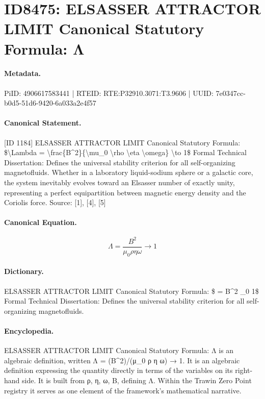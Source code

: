 \section*{ID8475: ELSASSER ATTRACTOR LIMIT Canonical Statutory Formula: Λ}
\paragraph{Metadata.}
PiID: 4906617583441 | RTEID: RTE:P32910.3071:T3.9606 | UUID: 7e0347cc-b0d5-51d6-9420-6a033a2e4f57

\paragraph{Canonical Statement.}
[ID 1184] ELSASSER ATTRACTOR LIMIT Canonical Statutory Formula: \$\textbackslash{}Lambda = \textbackslash{}frac\{B\textasciicircum{}2\}\{\textbackslash{}mu\_0 \textbackslash{}rho \textbackslash{}eta \textbackslash{}omega\} \textbackslash{}to 1\$ Formal Technical Dissertation: Defines the universal stability criterion for all self-organizing magnetofluids. Whether in a laboratory liquid-sodium sphere or a galactic core, the system inevitably evolves toward an Elsasser number of exactly unity, representing a perfect equipartition between magnetic energy density and the Coriolis force. Source: [1], [4], [5]

\paragraph{Canonical Equation.}
\[
\Lambda = \frac{B^2}{\mu_0 \rho \eta \omega} \to 1
\]

\paragraph{Dictionary.}
ELSASSER ATTRACTOR LIMIT Canonical Statutory Formula: \$ = B\textasciicircum{}2 \_0 1\$ Formal Technical Dissertation: Defines the universal stability criterion for all self-organizing magnetofluids.

\paragraph{Encyclopedia.}
ELSASSER ATTRACTOR LIMIT Canonical Statutory Formula: Λ is an algebraic definition, written Λ = (B\textasciicircum{}2)/(μ\_0 ρ η ω) → 1. It is an algebraic definition expressing the quantity directly in terms of the variables on its right-hand side. It is built from ρ, η, ω, B, defining Λ. Within the Trawin Zero Point registry it serves as one element of the framework's mathematical narrative.
